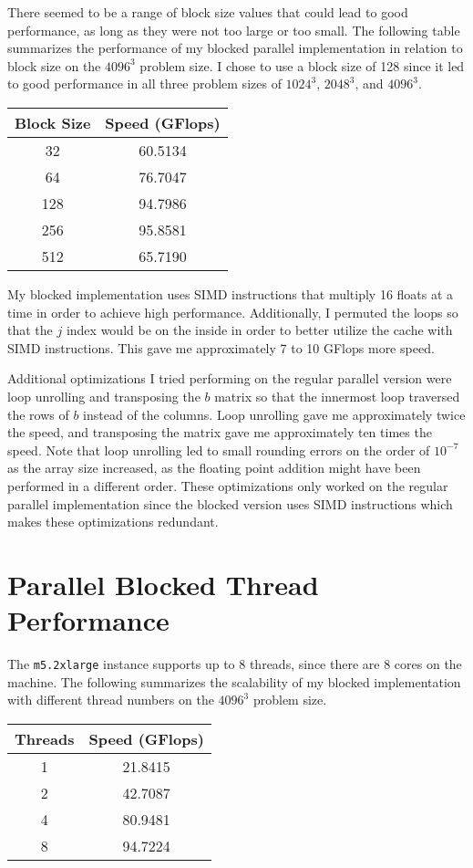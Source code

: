 \documentclass[12pt]{article}
\begin{document}
There seemed to be a range of block size values that could lead to good performance,
as long as they were not too large or too small. The following table summarizes the performance
of my blocked parallel implementation in relation to block size on the \(4096^3\) problem size.
I chose to use a block size of 128 since it led to good performance in all three problem sizes
of \(1024^3\), \(2048^3\), and \(4096^3\).
\begin{center}
    \begin{tabular} {c|c}
        Block Size & Speed (GFlops)\\
        \hline
        32 & 60.5134\\
        64 & 76.7047\\
        128 & 94.7986\\
        256 & 95.8581\\
        512 & 65.7190
    \end{tabular}
\end{center}
My blocked implementation uses SIMD instructions that multiply 16 floats at a time in order to achieve high
performance. Additionally, I permuted the loops so that the \(j\) index would be on the inside in order to
better utilize the cache with SIMD instructions. This gave me approximately 7 to 10 GFlops more speed.

Additional optimizations I tried performing on the regular parallel version were loop unrolling and transposing
the \(b\) matrix so that the innermost loop traversed the rows of \(b\) instead of the columns. Loop unrolling
gave me approximately twice the speed, and transposing the matrix gave me approximately ten times the speed.
Note that loop unrolling led to small rounding errors on the order of \(10^{-7}\) as the array size increased,
as the floating point addition might have been performed in a different order. These optimizations only worked
on the regular parallel implementation since the blocked version uses SIMD instructions which makes these
optimizations redundant.

\section{Parallel Blocked Thread Performance}

The \texttt{m5.2xlarge} instance supports up to 8 threads, since there are 8 cores on the machine.
The following summarizes the scalability of my blocked implementation with different thread numbers on the
\(4096^3\) problem size.
\begin{center}
    \begin{tabular} {c|c}
        Threads & Speed (GFlops)\\
        \hline
        1 & 21.8415\\
        2 & 42.7087\\
        4 & 80.9481\\
        8 & 94.7224
    \end{tabular}
\end{center}
\end{document}
